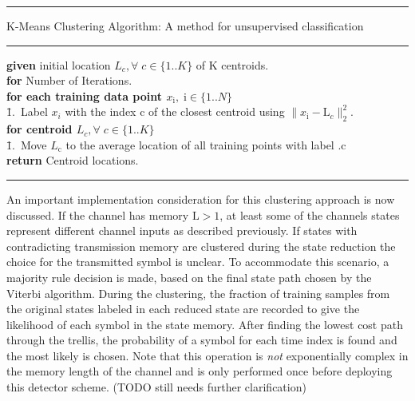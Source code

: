 \documentclass[12pt,a4paper]{report}
\begin{document}
    \noindent\rule[16pt]{\textwidth}{0.6pt}
K-Means Clustering Algorithm: A method for unsupervised classification

    \noindent\rule[10pt]{\textwidth}{0.4pt}
    {\footnotesize
    \begin{tabbing}
    {\bf given} initial location $L_c, \forall \;c  \in \{1..K\}$ of K centroids.\\
        {\textbf{for} Number of Iterations}.\\
         \qquad \= {\bf for each training data point $x_{\mathrm{i}}, \;\mathrm{i}  \in \{1..N\}$}\\
        \qquad \qquad \= 1.\ Label $x_i$ with the index c of the closest centroid using $\|x_{\mathrm{i}}- \text{L}_c\|^2_2$. \\
        \qquad \= {\bf for centroid $L_c, \forall \;c  \in \{1..K\}$}\\
                \qquad \qquad \= 1.\ Move $L_{\mathrm{c}}$ to the average location of all training points with label .c\\


        {\bf return} Centroid locations.
    \end{tabbing}}
    \noindent\rule[10pt]{\textwidth}{0.4pt}
    

\par
An important implementation consideration for this clustering approach is now discussed. If the channel has memory $\text{L}>1$, at least some of the channels states represent different channel inputs as described previously. If states with contradicting transmission memory are clustered during the state reduction the choice for the transmitted symbol is unclear. To accommodate this scenario, a majority rule decision is made, based on the final state path chosen by the Viterbi algorithm. During the clustering, the fraction of training samples from the original states labeled in each reduced state are recorded to give the likelihood of each symbol in the state memory. After finding the lowest cost path through the trellis, the probability of a symbol for each time index is found and the most likely is chosen. Note that this operation is \emph{not} exponentially complex in the memory length of the channel and is only performed once before deploying this detector scheme. (TODO still needs further clarification)
\end{document}
